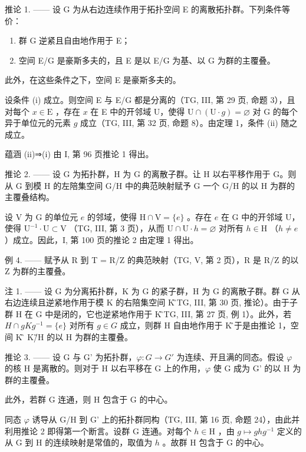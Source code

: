 推论 1. —— 设 G 为从右边连续作用于拓扑空间 E 的离散拓扑群。下列条件等价：

\begin{enumerate}
\def\labelenumi{(\roman{enumi})}
\item
  群 G 逆紧且自由地作用于 E；
\item
  空间 E/G 是豪斯多夫的，且 E 是以 E/G 为基、以 G 为群的主覆叠。
\end{enumerate}

此外，在这些条件之下，空间 E 是豪斯多夫的。

设条件 (i) 成立。则空间 E 与 E/G 都是分离的（TG, III, 第 29 页, 命题 3），且对每个 \(x \in \mathrm{E}\) ，存在 \(x\) 在 E 中的开邻域 U，使得 \(\mathrm{U} \cap (\mathrm{U} \cdot g) = \varnothing\) 对 G 的每个异于单位元的元素 \(g\) 成立（TG, III, 第 32 页, 命题 8）。由定理 1，条件 (ii) 随之成立。

蕴涵 (ii)⇒(i) 由 I, 第 96 页推论 1 得出。

推论 2. —— 设 G 为拓扑群，H 为 G 的离散子群。让 H 以右平移作用于 G。则从 G 到模 H 的左陪集空间 G/H 中的典范映射赋予 G 一个 G/H 的以 H 为群的主覆叠结构。

设 V 为 G 的单位元 \(e\) 的邻域，使得 \(\mathrm{H} \cap \mathrm{V} = \{e\}\) 。存在 \(e\) 在 G 中的开邻域 U，使得 \(\mathrm{U}^{-1} \cdot \mathrm{U} \subset \mathrm{V}\) （TG, III, 第 3 页），从而 \(\mathrm{U} \cap \mathrm{U} \cdot h = \varnothing\) 对所有 \(h \in \mathrm{H}\) （\(h \neq e\) ）成立。因此，I, 第 100 页的推论 2 由定理 1 得出。

例 4. —— 赋予从 R 到 T = R/Z 的典范映射（TG, V, 第 2 页），R 是 R/Z 的以 Z 为群的主覆叠。

注 1. —— 设 G 为分离拓扑群，K 为 G 的紧子群，H 为 G 的离散子群。群 G 从右边连续且逆紧地作用于模 K 的右陪集空间 K\G（TG, III, 第 30 页, 推论）。由于子群 H 在 G 中是闭的，它也逆紧地作用于 K\G（TG, III, 第 27 页, 例 1）。此外，若 \(H \cap gKg^{-1} = \{e\}\) 对所有 \(g \in G\) 成立，则群 H 自由地作用于 K\G。于是由推论 1，空间 K\G 是 K\G/H 的以 H 为群的主覆叠。

推论 3. —— 设 G 与 G' 为拓扑群，\(\varphi\colon G \to G'\) 为连续、开且满的同态。假设 \(\varphi\) 的核 H 是离散的。则对于 H 以右平移在 G 上的作用，\(\varphi\) 使 G 成为 G' 的以 H 为群的主覆叠。

此外，若群 G 连通，则 H 包含于 G 的中心。

同态 \(\varphi\) 诱导从 G/H 到 G' 上的拓扑群同构（TG, III, 第 16 页, 命题 24），由此并利用推论 2 即得第一个断言。设群 G 连通。对每个 \(h \in \mathrm{H}\) ，由 \(g \mapsto ghg^{-1}\) 定义的从 G 到 H 的连续映射是常值的，取值为 \(h\) 。故群 H 包含于 G 的中心。


